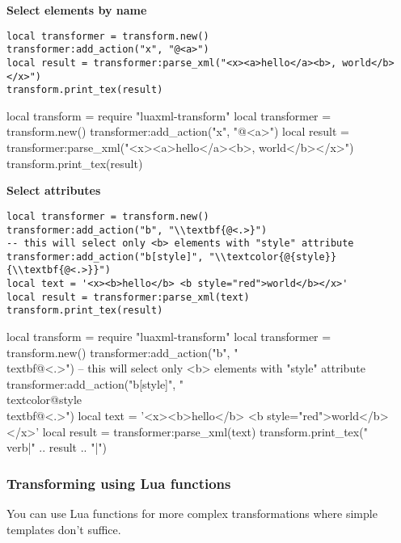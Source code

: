 \documentclass{ltxdoc}
\begin{document}
\noindent\textbf{Select elements by name}
\begin{verbatim}
local transformer = transform.new()
transformer:add_action("x", "@<a>")
local result = transformer:parse_xml("<x><a>hello</a><b>, world</b></x>")
transform.print_tex(result)
\end{verbatim}
\begin{framed}
\begin{luacode*}

local transform = require "luaxml-transform"
local transformer = transform.new()
transformer:add_action("x", "@<a>")
local result = transformer:parse_xml("<x><a>hello</a><b>, world</b></x>")
transform.print_tex(result)
\end{luacode*}
\end{framed}

\noindent\textbf{Select attributes}
\begin{verbatim}
local transformer = transform.new()
transformer:add_action("b", "\\textbf{@<.>}")
-- this will select only <b> elements with "style" attribute
transformer:add_action("b[style]", "\\textcolor{@{style}}{\\textbf{@<.>}}")
local text = '<x><b>hello</b> <b style="red">world</b></x>'
local result = transformer:parse_xml(text)
transform.print_tex(result)
\end{verbatim}
\begin{framed}
\begin{luacode*}

local transform = require "luaxml-transform"
local transformer = transform.new()
transformer:add_action("b", "\\textbf{@<.>}")
-- this will select only <b> elements with "style" attribute
transformer:add_action("b[style]", "\\textcolor{@{style}}{\\textbf{@<.>}}")
local text = '<x><b>hello</b> <b style="red">world</b></x>'
local result = transformer:parse_xml(text)
transform.print_tex("\\verb|" .. result .. "|")
\end{luacode*}
\end{framed}

\subsubsection{Transforming using Lua functions}

You can use Lua functions for more complex transformations where simple templates don't suffice. 
\end{document}
